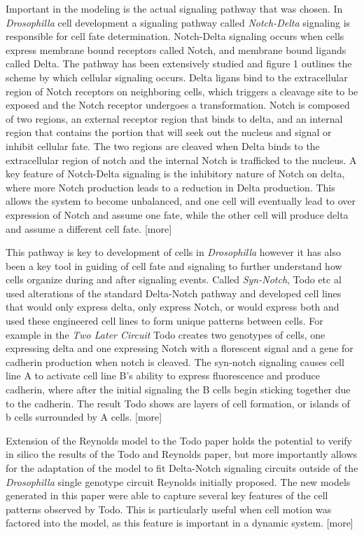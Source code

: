 Important in the modeling is the actual signaling pathway that was chosen. In \emph{Drosophilla} cell development a signaling pathway called \emph{Notch-Delta} signaling is responsible for cell fate determination. Notch-Delta signaling occurs when cells express membrane bound receptors called Notch, and membrane bound ligands called Delta. The pathway has been extensively studied and figure 1 outlines the scheme by which cellular signaling occurs. Delta ligans bind to the extracellular region of Notch receptors on neighboring cells, which triggers a cleavage site to be exposed and the Notch receptor undergoes a transformation. Notch is composed of two regions, an external receptor region that binds to delta, and an internal region that contains the portion that will seek out the nucleus and signal or inhibit cellular fate. The two regions are cleaved when Delta binds to the extracellular region of notch and the internal Notch is trafficked to the nucleus. A key feature of Notch-Delta signaling is the inhibitory nature of Notch on delta, where more Notch production leads to a reduction in Delta production. This allows the system to become unbalanced, and one cell will eventually lead to over expression of Notch and assume one fate, while the other cell will produce delta and assume a different cell fate. [more]

This pathway is key to development of cells in \emph{Drosophilla} however it has also been a key tool in guiding of cell fate and signaling to further understand how cells organize during and after signaling events. Called \emph{Syn-Notch}, Todo etc al used alterations of the standard Delta-Notch pathway and developed cell lines that would only express delta, only express Notch, or would express both and used these engineered cell lines to form unique patterns between cells. For example in the \emph{ Two Later Circuit} Todo creates two genotypes of cells, one expressing delta and one expressing Notch with a florescent signal and a gene for cadherin production when notch is cleaved. The syn-notch signaling causes cell line A to activate cell line B's ability to express fluorescence and produce cadherin, where after the initial signaling the B cells begin sticking together due to the cadherin.  The result Todo shows are layers of cell formation, or islands of b cells surrounded by A cells. [more]

Extension of the Reynolds model to the Todo paper holds the potential to verify in silico the results of the Todo and Reynolds paper, but more importantly allows for the adaptation of the model to fit Delta-Notch signaling circuits outside of the \emph{Drosophilla} single genotype circuit Reynolds initially proposed. The new models generated in this paper were able to capture several key features of the cell patterns observed by Todo. This is particularly useful when cell motion was factored into the model, as this feature is important in a dynamic system.  [more]


